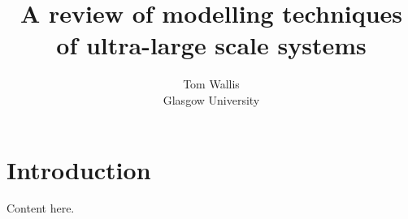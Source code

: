 \documentclass[12pt]{article}
\title{A review of modelling techniques of ultra-large scale systems}
\date{}
\author{Tom Wallis\\Glasgow University}
\begin{document}
\maketitle

\section{Introduction}
Content here.



\end{document}
